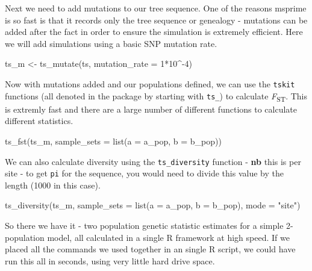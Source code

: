 \documentclass[
  letterpaper,
  DIV=11,
  numbers=noendperiod]{scrartcl}
\newenvironment{Shaded}{\begin{snugshade}}{\end{snugshade}}
\newcommand{\AttributeTok}[1]{\textcolor[rgb]{0.40,0.45,0.13}{#1}}
\newcommand{\DecValTok}[1]{\textcolor[rgb]{0.68,0.00,0.00}{#1}}
\newcommand{\FunctionTok}[1]{\textcolor[rgb]{0.28,0.35,0.67}{#1}}
\newcommand{\NormalTok}[1]{\textcolor[rgb]{0.00,0.23,0.31}{#1}}
\newcommand{\OtherTok}[1]{\textcolor[rgb]{0.00,0.23,0.31}{#1}}
\newcommand{\SpecialCharTok}[1]{\textcolor[rgb]{0.37,0.37,0.37}{#1}}
\newcommand{\StringTok}[1]{\textcolor[rgb]{0.13,0.47,0.30}{#1}}
\begin{document}
Next we need to add mutations to our tree sequence. One of the reasons
msprime is so fast is that it records only the tree sequence or
genealogy - mutations can be added after the fact in order to ensure the
simulation is extremely efficient. Here we will add simulations using a
basic SNP mutation rate.

\begin{Shaded}
\begin{Highlighting}[]
\NormalTok{ts\_m }\OtherTok{\textless{}{-}} \FunctionTok{ts\_mutate}\NormalTok{(ts, }\AttributeTok{mutation\_rate =} \DecValTok{1}\SpecialCharTok{*}\DecValTok{10}\SpecialCharTok{\^{}{-}}\DecValTok{4}\NormalTok{)}
\end{Highlighting}
\end{Shaded}

Now with mutations added and our populations defined, we can use the
\texttt{tskit} functions (all denoted in the package by starting with
\texttt{ts\_}) to calculate \emph{F}\textsubscript{ST}. This is extremly
fast and there are a large number of different functions to calculate
different statistics.

\begin{Shaded}
\begin{Highlighting}[]
\FunctionTok{ts\_fst}\NormalTok{(ts\_m, }\AttributeTok{sample\_sets =} \FunctionTok{list}\NormalTok{(}\AttributeTok{a =}\NormalTok{ a\_pop, }\AttributeTok{b =}\NormalTok{ b\_pop))}
\end{Highlighting}
\end{Shaded}

We can also calculate diversity using the \texttt{ts\_diversity}
function - \textbf{nb} this is per site - to get \texttt{pi} for the
sequence, you would need to divide this value by the length (1000 in
this case).

\begin{Shaded}
\begin{Highlighting}[]
\FunctionTok{ts\_diversity}\NormalTok{(ts\_m, }\AttributeTok{sample\_sets =} \FunctionTok{list}\NormalTok{(}\AttributeTok{a =}\NormalTok{ a\_pop, }\AttributeTok{b =}\NormalTok{ b\_pop),}
             \AttributeTok{mode =} \StringTok{"site"}\NormalTok{)}
\end{Highlighting}
\end{Shaded}

So there we have it - two population genetic statistic estimates for a
simple 2-population model, all calculated in a single R framework at
high speed. If we placed all the commands we used together in an single
R script, we could have run this all in seconds, using very little hard
drive space.
\end{document}
